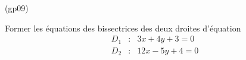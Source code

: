 \begin{tiny}(gp09)\end{tiny}
Former les équations des bissectrices des deux droites d'équation
\begin{eqnarray*}
D_{1} &:&3x+4y+3=0 \\
D_{2} &:&12x-5y+4=0
\end{eqnarray*}
